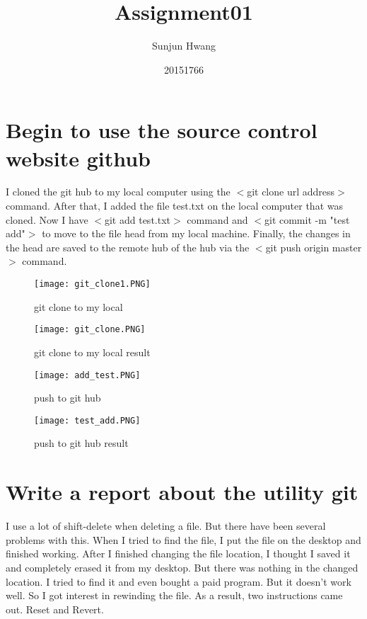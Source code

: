 \documentclass[a4paper]{article}
\title{Assignment01}
\author{Sunjun Hwang}
\date{20151766}
\begin{document}
\maketitle

\section{Begin to use the source control website github}


I cloned the git hub to my local computer using the $<$git clone url address$>$ command.
After that, I added the file test.txt on the local computer that was cloned.
Now I have $<$git add test.txt$>$ command and $<$git commit -m "test add"$>$ to move to the file head from my local machine. Finally, the changes in the head are saved to the remote hub of the hub via the $<$git push origin master$>$ command.

\begin{figure}[!htbp]
\begin{center}
\texttt{[image: git\_clone1.PNG]}
\end{center}
\caption{git clone to my local}\label{exampleplot}
\end{figure}
\begin{figure}[!htbp]
\begin{center}
\texttt{[image: git\_clone.PNG]}
\end{center}
\caption{git clone to my local result}\label{exampleplot}
\end{figure}
\begin{figure}[!htbp]
\begin{center}
\texttt{[image: add\_test.PNG]}
\end{center}
\caption{push to git hub}\label{exampleplot}
\end{figure}
\begin{figure}[!htbp]
\begin{center}
\texttt{[image: test\_add.PNG]}
\end{center}
\caption{push to git hub result}\label{exampleplot}
\end{figure}


\section{Write a report about the utility git}

I use a lot of shift-delete when deleting a file. But there have been several problems with this. When I tried to find the file, I put the file on the desktop and finished working. After I finished changing the file location, I thought I saved it and completely erased it from my desktop. But there was nothing in the changed location. I tried to find it and even bought a paid program. But it doesn't work well. 
So I got interest in rewinding the file. As a result, two instructions came out. Reset and Revert.
\end{document}
